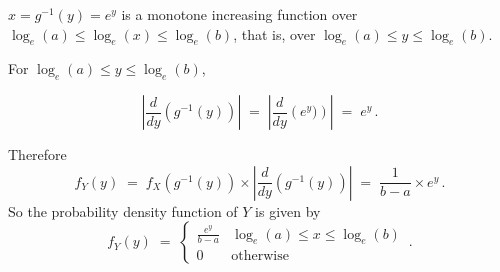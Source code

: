 \begin{ExerciseList}
 $x= g^{-1}(y) = e^y$ is a monotone increasing function over $\log_e(a) \leqslant   \log_e(x) \leqslant \log_e(b)$, that is, over $\log_e(a) \leqslant   y \leqslant   \log_e(b)$.

For $\log_e(a) \leqslant   y \leqslant   \log_e(b)$,

\[\left|  \frac{d}{dy}\left(g^{-1}(y)\right)\right|\;=\; \left|  \frac{d}{dy}\left(e^y)\right)\right|\;=\; e^y\,.\]

Therefore 
\[
  f_Y(y) \;=\; f_X\left(g^{-1}(y)\right) \times  \left|  \frac{d}{dy} \left(g^{-1}(y)\right)\right|\;=\; \frac{1}{b-a} \times e^y\,.
\]
So the  probability density
  function  of $Y$ is given by  
\[f_Y(y)\;=\;\begin{cases} \displaystyle  \frac{e^y}{b-a}  &   \log_e(a)\leqslant x \leqslant \log_e(b)\\ 0 &
  \text{otherwise}
\end{cases} \,.
\]


\end{ExerciseList}

